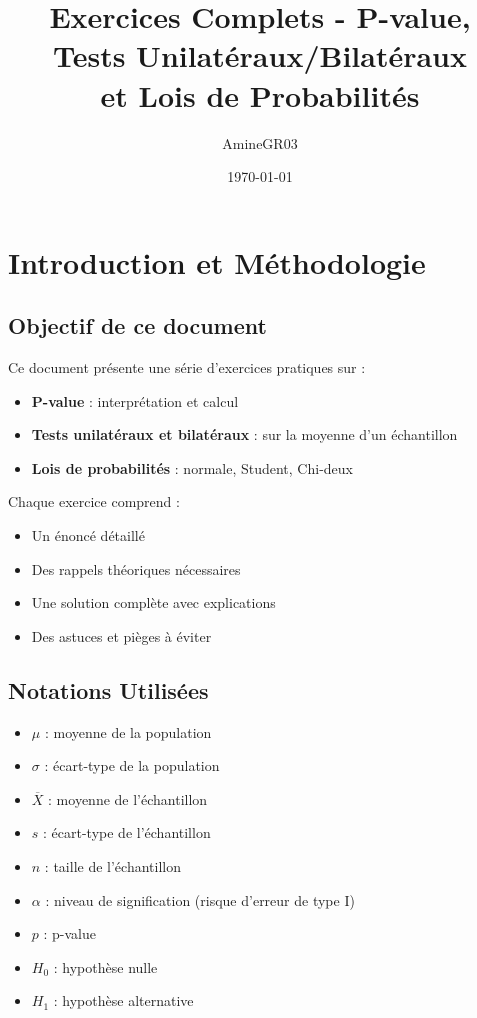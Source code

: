 \documentclass[11pt,a4paper]{article}
\title{Exercices Complets - P-value, Tests Unilatéraux/Bilatéraux\\et Lois de Probabilités}
\author{AmineGR03}
\date{\today}
\begin{document}
\maketitle

\tableofcontents
\newpage

\section{Introduction et Méthodologie}

\subsection{Objectif de ce document}

Ce document présente une série d'exercices pratiques sur :
\begin{itemize}
    \item \textbf{P-value} : interprétation et calcul
    \item \textbf{Tests unilatéraux et bilatéraux} : sur la moyenne d'un échantillon
    \item \textbf{Lois de probabilités} : normale, Student, Chi-deux
\end{itemize}

Chaque exercice comprend :
\begin{itemize}
    \item Un énoncé détaillé
    \item Des rappels théoriques nécessaires
    \item Une solution complète avec explications
    \item Des astuces et pièges à éviter
\end{itemize}

\subsection{Notations Utilisées}

\begin{itemize}
    \item $\mu$ : moyenne de la population
    \item $\sigma$ : écart-type de la population
    \item $\overline{X}$ : moyenne de l'échantillon
    \item $s$ : écart-type de l'échantillon
    \item $n$ : taille de l'échantillon
    \item $\alpha$ : niveau de signification (risque d'erreur de type I)
    \item $p$ : p-value
    \item $H_0$ : hypothèse nulle
    \item $H_1$ : hypothèse alternative
\end{itemize}
\end{document}
